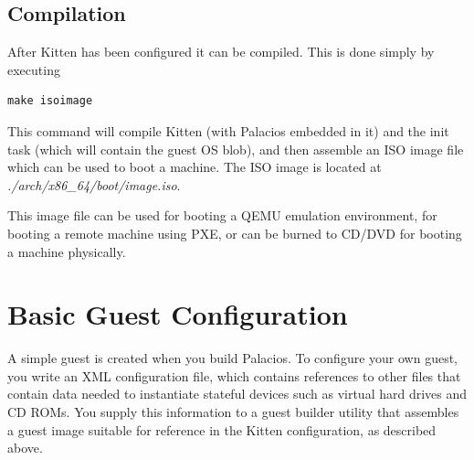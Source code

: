 \documentclass[11pt]{article}
\begin{document}
\subsection{Compilation}

After Kitten has been configured it can be compiled.  This is done
simply by executing
\begin{verbatim}
make isoimage
\end{verbatim}
This command will compile Kitten (with Palacios embedded in it) and
the init task (which will contain the guest OS blob), and then
assemble an ISO image file which can be used to boot a machine.  The ISO
image is located at {\em ./arch/x86\_64/boot/image.iso}.  

This image file can be used for booting a QEMU emulation environment,
for booting a remote machine using PXE, or can be burned to CD/DVD for
booting a machine physically. 


\section{Basic Guest Configuration}
\label{sec:guestconfig}

A simple guest is created when you build Palacios.  To configure your
own guest, you write an XML configuration file, which contains
references to other files that contain data needed to instantiate
stateful devices such as virtual hard drives and CD ROMs.  You supply
this information to a guest builder utility that assembles a guest
image suitable for reference in the Kitten configuration, as described
above.
\end{document}
